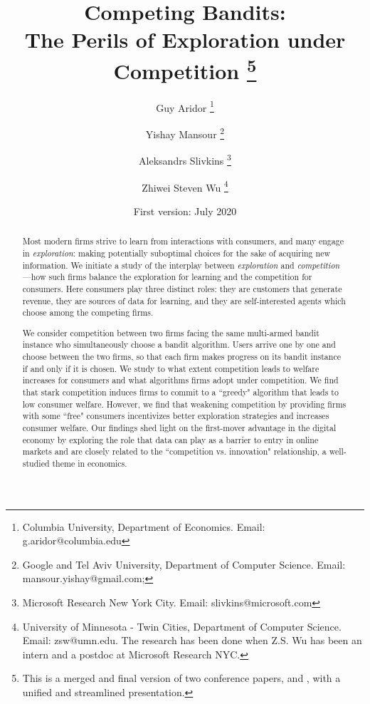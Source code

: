 \documentclass[11pt]{article}
\begin{document}

\title{Competing Bandits:\\
The Perils of Exploration under Competition%
\thanks{This is a merged and final version of two conference papers,
\citet{CompetingBandits-itcs18} and \citet{CompetingBandits-ec19},
with a unified and streamlined presentation.}}

\author{Guy Aridor%
\footnote{Columbia University, Department of Economics. Email: g.aridor@columbia.edu}
\and
Yishay Mansour%
\footnote{Google and Tel Aviv University, Department of Computer Science. Email: mansour.yishay@gmail.com;}
\and
Aleksandrs Slivkins%
\footnote{Microsoft Research New York City. Email: slivkins@microsoft.com}
\and
Zhiwei Steven Wu%
\footnote{University of Minnesota - Twin Cities, Department of Computer Science. Email: zsw@umn.edu.\newline
The research has been done when Z.S. Wu has been an intern and a postdoc at Microsoft Research NYC.
}}
\date{First version: July 2020}
\maketitle
\begin{abstract}
Most modern firms strive to learn from interactions with consumers, and many engage in \emph{exploration}: making potentially suboptimal choices for the sake of acquiring new information. We initiate a study of the interplay between \emph{exploration} and \emph{competition}—how such firms balance the exploration for learning and the competition for consumers. Here consumers play three distinct roles: they are customers that generate revenue, they are sources of data for learning, and they are self-interested agents which choose among the competing firms.

We consider competition between two firms facing the same multi-armed bandit instance who simultaneously choose a bandit algorithm. Users arrive one by one and choose between the two firms, so that each firm makes progress on its bandit instance if and only if it is chosen. We study to what extent competition leads to welfare increases for consumers and what algorithms firms adopt under competition. We find that stark competition induces firms to commit to a ``greedy" algorithm that leads to low consumer welfare. However, we find that weakening competition by providing firms with some ``free" consumers incentivizes better exploration strategies and increases consumer welfare. Our findings shed light on the first-mover advantage in the digital economy by exploring the role that data can play as a barrier to entry in online markets and are closely related to the ``competition vs. innovation" relationship, a well-studied theme in economics.

\vspace{0.2in}

\bigskip
\end{abstract}
\end{document}
